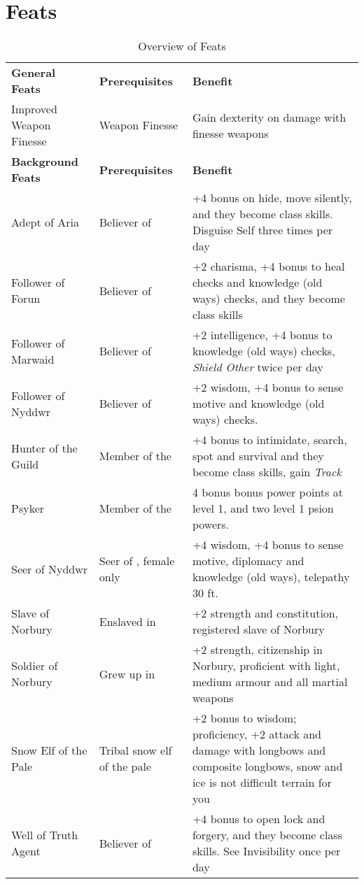 \section{Feats}
\label{sec:Feats}

\begin{table*}[!htb]
  \caption{Overview of Feats}
  \begin{tabular}{l l p{7cm}}
    \textbf{General Feats}    & \textbf{Prerequisites}           & \textbf{Benefit} \\
    Improved Weapon Finesse   & Weapon Finesse                   & Gain dexterity on damage with finesse weapons \\
    \textbf{Background Feats} & \textbf{Prerequisites}           & \textbf{Benefit} \\
    Adept of Aria             & Believer of \nameref{sec:Aria}   & +4 bonus on hide, move silently, and they become class skills. Disguise Self three times per day \\
    Follower of Forun         & Believer of \nameref{sec:Forun}  & +2 charisma, +4 bonus to heal checks and knowledge (old ways) checks, and they become class skills \\
    Follower of Marwaid       & Believer of \nameref{sec:Marwaid}& +2 intelligence, +4 bonus to knowledge (old ways) checks, \emph{Shield Other} twice per day \\
    Follower of Nyddwr        & Believer of \nameref{sec:Nyddwr} & +2 wisdom, +4 bonus to sense motive and knowledge (old ways) checks. \\
    Hunter of the Guild       & Member of the \nameref{sec:Hunters Guild} & +4 bonus to intimidate, search, spot and survival and they become class skills, gain \emph{Track} \\
    Psyker                    & Member of the \nameref{sec:Helemic Order} & 4 bonus bonus power points at level 1, and two level 1 psion powers. \\
    Seer of Nyddwr            & Seer of \nameref{sec:Nyddwr}, female only & +4 wisdom, +4 bonus to sense motive, diplomacy and knowledge (old ways), telepathy 30 ft. \\
    Slave of Norbury          & Enslaved in \nameref{sec:Norbury}& +2 strength and constitution, registered slave of Norbury \\
    Soldier of Norbury        & Grew up in \nameref{sec:Norbury} & +2 strength, citizenship in Norbury, proficient with light, medium armour and all martial weapons \\
    Snow Elf of the Pale      & Tribal snow elf of the pale      & +2 bonus to wisdom; proficiency, +2 attack and damage with longbows and composite longbows, snow and ice is not difficult terrain for you \\
    Well of Truth Agent       & Believer of \nameref{sec:Aria}   & +4 bonus to open lock and forgery, and they become class skills. See Invisibility once per day \\
  \end{tabular}
\end{table*}

